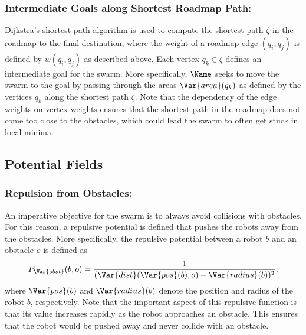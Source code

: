 \subsubsection{Intermediate Goals along Shortest Roadmap Path:} Dijkstra's shortest-path
algorithm is used to compute the shortest path $\zeta$ in the roadmap
to the final destination, where the weight of a roadmap edge $(q_i, q_j)$ is
defined by $w(q_i, q_j)$ as described above. Each vertex $q_k \in
\zeta$ defines an intermediate goal for the swarm. More specifically,
$\Name$ seeks to move the swarm to the goal by passing through the
areas $\Var{area}(q_k)$ as defined by the vertices $q_k$ along the
shortest path $\zeta$. Note that the dependency of the edge weights
on vertex weights ensures that the shortest path in the roadmap does
not come too close to the obstacles, which could lead the swarm to
often get stuck in local minima.

\subsection{Potential Fields}
\label{sec:PF}

\subsubsection{Repulsion from Obstacles:}
\label{sec:PFobst} An imperative objective for
the swarm is to always avoid collisions with obstacles. For this
reason, a repulsive potential is defined that pushes the robots away
from the obstacles. More specifically, the repulsive potential between
a robot $b$ and an obstacle $o$ is defined as
$$ P_\Var{obst}(b, o) = \frac{1}{(\Var{dist}(\Var{pos}(b), o) - \Var{radius}(b))^2},
$$ where $\Var{pos}(b)$ and
$\Var{radius}(b)$ denote the position and radius of the robot $b$, respectively. Note that the
important aspect of this repulsive function is that its value
increases rapidly as the robot approaches an obstacle. This ensures
that the robot would be pushed away and never collide with an obstacle.


